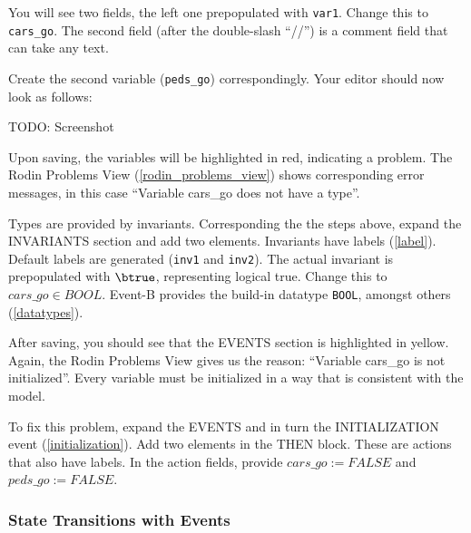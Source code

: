 You will see two fields, the left one prepopulated with \texttt{var1}.  Change this to \texttt{cars\_go}.  The second field (after the double-slash ``//'') is a comment field that can take any text.


Create the second variable (\texttt{peds\_go}) correspondingly.  Your editor should now look as follows:

TODO: Screenshot

Upon saving, the variables will be highlighted in red, indicating a problem.  The \textsf{Rodin Problems} View (\ref{rodin_problems_view}) shows corresponding error messages, in this case ``Variable cars\_go does not have a type''.

Types are provided by invariants.  Corresponding the the steps above, expand the \textsf{INVARIANTS} section and add two elements.  Invariants have labels (\ref{label}).  Default labels are generated (\texttt{inv1} and \texttt{inv2}).  The actual invariant is prepopulated with $\btrue$, representing logical true.  Change this to $cars\_go \in  BOOL$.  Event-B provides the build-in datatype \texttt{BOOL}, amongst others (\ref{datatypes}).


After saving, you should see that the \textsf{EVENTS} section is highlighted in yellow.  Again, the \textsf{Rodin Problems} View gives us the reason: ``Variable cars\_go is not initialized''.  Every variable must be initialized in a way that is consistent with the model.

To fix this problem, expand the \textsf{EVENTS} and in turn the INITIALIZATION event (\ref{initialization}).  Add two elements in the \textsf{THEN} block.  These are actions that also have labels.  In the action fields, provide $cars\_go :=  FALSE$ and $peds\_go :=  FALSE$.

\subsubsection{State Transitions with Events}

